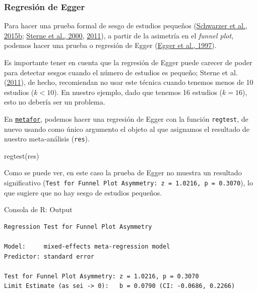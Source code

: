 \documentclass[
  bookmarksnumbered]{article}
\newenvironment{Shaded}{\begin{snugshade}}{\end{snugshade}}
\newcommand{\FunctionTok}[1]{\textcolor[rgb]{0.39,0.29,0.61}{#1}}
\newcommand{\NormalTok}[1]{\textcolor[rgb]{0.12,0.11,0.11}{#1}}
\begin{document}
\hypertarget{reg-egger}{%
\subsubsection{Regresión de Egger}\label{reg-egger}}

Para hacer una prueba formal de sesgo de estudios pequeños (\protect\hyperlink{ref-schwarzerSmallStudyEffectsMetaAnalysis2015}{Schwarzer et al., 2015b}; \protect\hyperlink{ref-sternePublicationRelatedBias2000}{Sterne et al., 2000}, \protect\hyperlink{ref-sterneRecommendationsExaminingInterpreting2011}{2011}), a partir de la asimetría en el \emph{funnel plot}, podemos hacer una prueba o regresión de Egger (\protect\hyperlink{ref-eggerBiasMetaanalysisDetected1997}{Egger et al., 1997}).

Es importante tener en cuenta que la regresión de Egger puede carecer de poder para detectar sesgos cuando el número de estudios es pequeño; Sterne et al. (\protect\hyperlink{ref-sterneRecommendationsExaminingInterpreting2011}{2011}), de hecho, recomiendan no usar este técnica cuando tenemos menos de 10 estudios (\(k < 10\)). En nuestro ejemplo, dado que tenemos 16 estudios (\(k = 16\)), esto no debería ser un problema.

En \href{https://www.metafor-project.org/doku.php}{\texttt{metafor}}, podemos hacer una regresión de Egger con la función \texttt{regtest}, de nuevo usando como único argumento el objeto al que asignamos el resultado de nuestro meta-análisis (\texttt{res}).

\begin{Shaded}
\begin{Highlighting}[]
\FunctionTok{regtest}\NormalTok{(res)}
\end{Highlighting}
\end{Shaded}

Como se puede ver, en este caso la prueba de Egger no muestra un resultado significativo (\texttt{Test\ for\ Funnel\ Plot\ Asymmetry:\ z\ =\ 1.0216,\ p\ =\ 0.3070}), lo que sugiere que no hay sesgo de estudios pequeños.

\begin{ROut}{Consola de R: Output~\thetcbcounter}
                \begin{footnotesize}
                \begin{verbatim} 
Regression Test for Funnel Plot Asymmetry

Model:     mixed-effects meta-regression model
Predictor: standard error

Test for Funnel Plot Asymmetry: z = 1.0216, p = 0.3070
Limit Estimate (as sei -> 0):   b = 0.0790 (CI: -0.0686, 0.2266)
 \end{verbatim}
                \end{footnotesize}
                \end{ROut}
\end{document}

